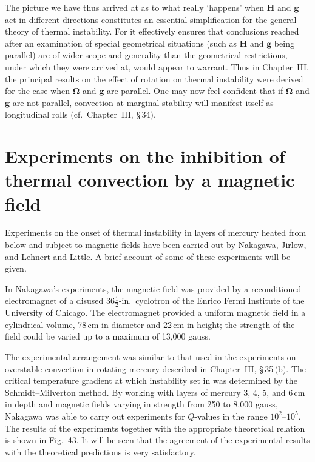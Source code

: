 The picture we have thus arrived at as to what really `happens' when $\mathbf{H}$ and $\mathbf{g}$ act in different directions constitutes an essential simplification for the general theory of thermal instability. For it effectively ensures that conclusions reached after an examination of special geometrical situations (such as $\mathbf{H}$ and $\mathbf{g}$ being parallel) are of wider scope and generality than the geometrical restrictions, under which they were arrived at, would appear to warrant. Thus in Chapter~III, the principal results on the effect of rotation on thermal instability were derived for the case when $\boldsymbol{\Omega}$ and $\mathbf{g}$ are parallel. One may now feel confident that if $\boldsymbol{\Omega}$ and $\mathbf{g}$ are not parallel, convection at marginal stability will manifest itself as longitudinal rolls (cf.\ Chapter~III, \S\,34).

\section{Experiments on the inhibition of thermal convection by a magnetic field}\label{sec:48}

Experiments on the onset of thermal instability in layers of mercury heated from below and subject to magnetic fields have been carried out by Nakagawa, Jirlow, and Lehnert and Little. A brief account of some of these experiments will be given.

In Nakagawa's experiments, the magnetic field was provided by a reconditioned electromagnet of a disused $36\tfrac{1}{2}$-in.\ cyclotron of the Enrico Fermi Institute of the University of Chicago. The electromagnet provided a uniform magnetic field in a cylindrical volume, 78\,cm in diameter and 22\,cm in height; the strength of the field could be varied up to a maximum of 13{,}000 gauss.

The experimental arrangement was similar to that used in the experiments on overstable convection in rotating mercury described in Chapter~III, \S\,35\,(b). The critical temperature gradient at which instability set in was determined by the Schmidt--Milverton method. By working with layers of mercury 3, 4, 5, and 6\,cm in depth and magnetic fields varying in strength from 250 to 8{,}000 gauss, Nakagawa was able to carry out experiments for $Q$-values in the range $10^2$--$10^5$. The results of the experiments together with the appropriate theoretical relation is shown in Fig.~43. It will be seen that the agreement of the experimental results with the theoretical predictions is very satisfactory.

